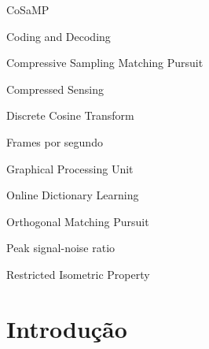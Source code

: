 \documentclass[cic,tc]{iiufrgs}
\begin{document}
\begin{listofabbrv}{CoSaMP}
    \item[CoDec] Coding and Decoding  
    \item[CoSaMP] Compressive Sampling Matching Pursuit 
    \item[CS] Compressed Sensing
    \item[DCT] Discrete Cosine Transform 
    \item[FPS] Frames por segundo
    \item[GPU] Graphical Processing Unit
    \item[ODL] Online Dictionary Learning 
    \item[OMP] Orthogonal Matching Pursuit
    \item[PSNR] Peak signal-noise ratio 
    \item[RIP] Restricted Isometric Property
\end{listofabbrv}


\tableofcontents


\chapter{Introdução}

\end{document}
